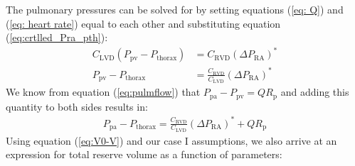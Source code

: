 \documentclass[12pt]{article}
\begin{document}
The pulmonary pressures can be solved for by setting equations (\ref{eq: Q}) and (\ref{eq: heart rate}) equal to each other and substituting equation (\ref{eq:crtlled_Pra_pth}):
\begin{align}
    C_\text{LVD}(P_\text{pv} - P_\text{thorax}) &= C_\text{RVD} \left( \Delta P_\text{RA} \right)^* \\
    P_\text{pv} - P_\text{thorax} &= \frac{C_\text{RVD}}{C_\text{LVD}}\left( \Delta P_\text{RA} \right)^* 
\end{align}
We know from equation (\ref{eq:pulmflow}) that $P_\text{pa}-P_\text{pv} = QR_\text{p}$ and adding this quantity to both sides results in: 
\begin{align}
    P_\text{pa} - P_\text{thorax}= \frac{C_\text{RVD}}{C_\text{LVD}}\left( \Delta P_\text{RA} \right)^* + QR_\text{p}
    \end{align}
Using equation (\ref{eq:V0-V}) and our case I assumptions, we also arrive at an expression for total reserve volume as a function of parameters:
\end{document}
